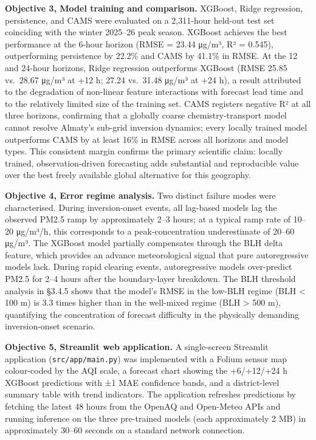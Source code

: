 \textbf{Objective 3, Model training and comparison.} XGBoost, Ridge regression, persistence, and CAMS were evaluated on a 2,311-hour held-out test set coinciding with the winter 2025--26 peak season. XGBoost achieves the best performance at the 6-hour horizon (RMSE = 23.44 μg/m³, R² = 0.545), outperforming persistence by 22.2\% and CAMS by 41.1\% in RMSE. At the 12 and 24-hour horizons, Ridge regression outperforms XGBoost (RMSE 25.85 vs.~28.67 μg/m³ at +12 h; 27.24 vs.~31.48 μg/m³ at +24 h), a result attributed to the degradation of non-linear feature interactions with forecast lead time and to the relatively limited size of the training set. CAMS registers negative R² at all three horizons, confirming that a globally coarse chemistry-transport model cannot resolve Almaty's sub-grid inversion dynamics; every locally trained model outperforms CAMS by at least 16\% in RMSE across all horizons and model types. This consistent margin confirms the primary scientific claim: locally trained, observation-driven forecasting adds substantial and reproducible value over the best freely available global alternative for this geography.

\textbf{Objective 4, Error regime analysis.} Two distinct failure modes were characterised. During inversion-onset events, all lag-based models lag the observed PM2.5 ramp by approximately 2--3 hours; at a typical ramp rate of 10--20 μg/m³/h, this corresponds to a peak-concentration underestimate of 20--60 μg/m³. The XGBoost model partially compensates through the BLH delta feature, which provides an advance meteorological signal that pure autoregressive models lack. During rapid clearing events, autoregressive models over-predict PM2.5 for 2--4 hours after the boundary-layer breakdown. The BLH threshold analysis in §3.4.5 shows that the model's RMSE in the low-BLH regime (BLH \textless{} 100 m) is 3.3 times higher than in the well-mixed regime (BLH \textgreater{} 500 m), quantifying the concentration of forecast difficulty in the physically demanding inversion-onset scenario.

\textbf{Objective 5, Streamlit web application.} A single-screen Streamlit application (\texttt{src/app/main.py}) was implemented with a Folium sensor map colour-coded by the AQI scale, a forecast chart showing the +6/+12/+24 h XGBoost predictions with ±1 MAE confidence bands, and a district-level summary table with trend indicators. The application refreshes predictions by fetching the latest 48 hours from the OpenAQ and Open-Meteo APIs and running inference on the three pre-trained models (each approximately 2 MB) in approximately 30--60 seconds on a standard network connection.

